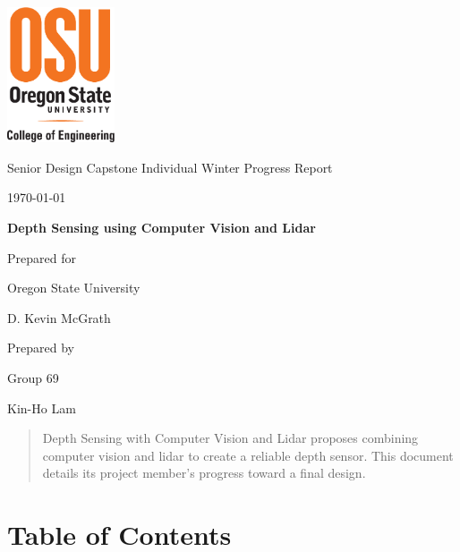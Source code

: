 \documentclass[onecolumn, draftclsnofoot,10pt, compsoc]{IEEEtran}
\def \CapstoneTeamName{			}
\def \CapstoneTeamNumber{		69}
\def \GroupMemberOne{			Kin-Ho Lam}
\def \CapstoneProjectName{		Depth Sensing using Computer Vision and Lidar}
\def \CapstoneSponsorCompany{	Oregon State University}
\def \CapstoneSponsorPerson{	D. Kevin McGrath}
\def \DocType{
	Individual Winter Progress Report
}
\newcommand{\NameSigPair}[1]{\par
	\makebox[2.75in][r]{#1} \hfil 	\makebox[3.25in]{\makebox[2.25in]{\hrulefill} \hfill		\makebox[.75in]{\hrulefill}}
	\par\vspace{-12pt} \textit{\tiny\noindent
		\makebox[2.75in]{} \hfil		\makebox[3.25in]{\makebox[2.25in][r]{Signature} \hfill	\makebox[.75in][r]{Date}}}}
\renewcommand{\NameSigPair}[1]{#1}
\begin{document}
	\begin{titlepage}
		\begin{singlespace}
			\centering
			\includegraphics[height=4cm,natwidth=345,natheight=435]{images/osu_logo.png}
			\hfill 
			\par\vspace{.2in}
			\centering
			\scshape{
				\huge Senior Design Capstone \DocType \par
				{\large\today}\par
				\vspace{.5in}
				\textbf{\Huge\CapstoneProjectName}\par
				\vfill
				{\large Prepared for}\par
				\Huge \CapstoneSponsorCompany\par
				\vspace{5pt}
				{\Large\NameSigPair{\CapstoneSponsorPerson}\par}
				{\large Prepared by }\par
				Group\CapstoneTeamNumber\par
				\CapstoneTeamName\par 
				\vspace{5pt}
				{\large
					\NameSigPair{\GroupMemberOne}\par
				}
				\vspace{20pt}
			}
			\begin{abstract}  
 				Depth Sensing with Computer Vision and Lidar proposes combining computer vision and lidar to create a reliable depth sensor.
				This document details its project member's progress toward a final design.
			\end{abstract}     
		\end{singlespace}
	\end{titlepage}
\section{Table of Contents}
\tableofcontents


\clearpage
\end{document}
